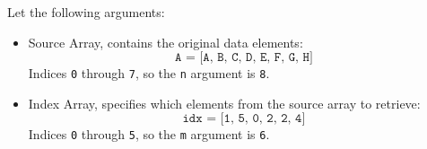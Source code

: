 \highspace
\begin{examplebox}
    Let the following arguments:
    \begin{itemize}
        \item Source Array, contains the original data elements:
        \begin{equation*}
            \texttt{A = [A, B, C, D, E, F, G, H]}
        \end{equation*}
        Indices \texttt{0} through \texttt{7}, so the \texttt{n} argument is \texttt{8}.

        \item Index Array, specifies which elements from the source array to retrieve:
        \begin{equation*}
            \texttt{idx = [1, 5, 0, 2, 2, 4]}
        \end{equation*}
        Indices \texttt{0} through \texttt{5}, so the \texttt{m} argument is \texttt{6}.


\end{itemize}
\end{examplebox}
